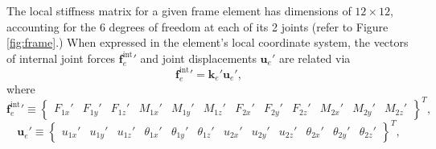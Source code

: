 \documentclass[12pt,a4paper,article]{memoir} %
\begin{document}
The local stiffness matrix for a given frame element has dimensions of $12 \times 12$, accounting for the 6 degrees of freedom at each of its 2 joints (refer to Figure \ref{fig:frame}.) When expressed in the element's local coordinate system, the vectors of internal joint forces ${\mathbf{f}_e^{\text{int}}}'$ and joint displacements $\mathbf{u}_e'$ are related via
\begin{equation}
	{\mathbf{f}_e^{\text{int}}}' = \mathbf{k}_e' \mathbf{u}_e',
\end{equation}
where
\begin{equation}
	{\mathbf{f}_e^{\text{int}}}' \equiv \left\{ \begin{array}{cccccccccccc} F_{1x}' & F_{1y}' & F_{1z}' & M_{1x}' & M_{1y}' & M_{1z}' &  F_{2x}' & F_{2y}' & F_{2z}' & M_{2x}' & M_{2y}' & M_{2z}' \end{array} \right\}^T,
\end{equation}
\begin{equation}
	\mathbf{u}_e' \equiv \left\{ \begin{array}{cccccccccccc} u_{1x}' & u_{1y}' & u_{1z}' & \theta_{1x}' & \theta_{1y}' & \theta_{1z}' &  u_{2x}' & u_{2y}' & u_{2z}' & \theta_{2x}' & \theta_{2y}' & \theta_{2z}' \end{array} \right\}^T,
\end{equation}
\setlength\arraycolsep{-1pt}
\end{document}

